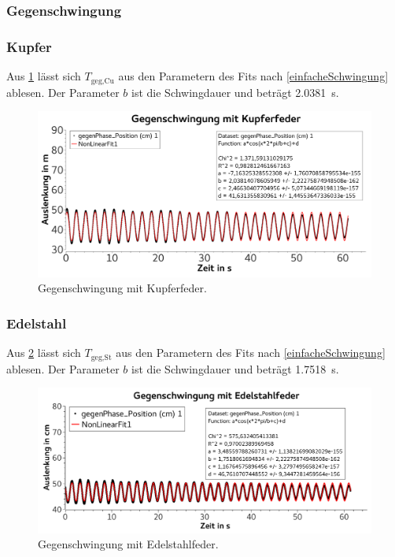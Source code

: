 \documentclass[
	a4paper,
	12pt,
	pagesize,
	ngerman
]{scrartcl}
\begin{document}
	\subsubsection{Gegenschwingung}

	\subsubsection*{Kupfer}
	Aus \cref{KupferGegenschwingung} lässt sich $T_\text{geg,Cu}$ aus den Parametern des Fits nach \cref{einfacheSchwingung} ablesen. Der Parameter $b$ ist die Schwingdauer und beträgt \SI{2,0381}{s}.
	\begin{figure}[H]
		\includegraphics[width=1\textwidth]{KupferGegenschwingung}
		\centering
		\caption{Gegenschwingung mit Kupferfeder.}
		\label{KupferGegenschwingung}
		\centering
	\end{figure}

	\subsubsection*{Edelstahl}
	Aus \cref{EdelstahlGegenschwingung} lässt sich $T_\text{geg,St}$ aus den Parametern des Fits nach \cref{einfacheSchwingung} ablesen. Der Parameter $b$ ist die Schwingdauer und beträgt \SI{1,7518}{s}.
	\begin{figure}[H]
		\includegraphics[width=1\textwidth]{EdelstahlGegenschwingung}
		\centering
		\caption{Gegenschwingung mit Edelstahlfeder.}
		\label{EdelstahlGegenschwingung}
		\centering
	\end{figure}
\end{document}
